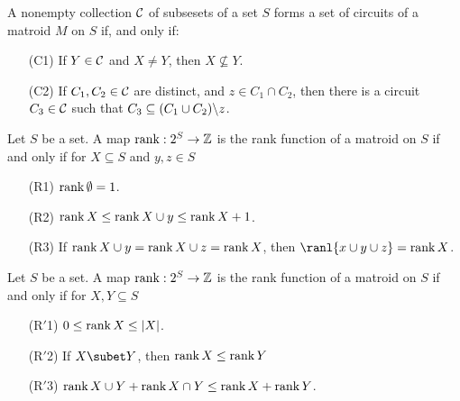\begin{theorem}\label{1.1.2}
    A nonempty collection $\mathcal{C}$ of subsesets of a set $S$ forms a set of circuits of a matroid $M$ on
    $S$ if, and only if:
        \begin{enumerate}
            \item[(C1)] If $Y \in \mathcal{C}$ and  $X \neq Y$, then  $X \not\subseteq Y$.

            \item[(C2)] If $ C_1,C_2 \in \mathcal{C}$ are distinct, and $z \in C_1 \cap C_2$, then there is
                a circuit $ C_3 \in \mathcal{C}$ such that $ C_3 \subseteq (C_1\cup C_2)\backslash z$.
        \end{enumerate}
\end{theorem}

\begin{theorem}\label{1.1.3}
    Let $S$ be a set. A map $\operatorname{rank}:2^S \rightarrow \mathbb{Z}$ is the rank function of a matroid on $S$ if
    and only if for $X \subseteq S$ and  $y,z \in S$
        \begin{enumerate}
            \item[(R1)] $\operatorname{rank}{\emptyset}=1$.

            \item[(R2)] $\operatorname{rank}{X} \leq \operatorname{rank}{X \cup y} \leq \operatorname{rank}{X}+1$.

            \item[(R3)] If $\operatorname{rank}{X \cup y}=\operatorname{rank}{X \cup z}=\operatorname{rank}{X}$, then $\ranl{x \cup y \cup
                z}=\rank{X}$.
        \end{enumerate}
\end{theorem}

\begin{theorem}\label{1.1.4}
    Let $S$ be a set. A map $\operatorname{rank}:2^S \rightarrow \mathbb{Z}$ is the rank function of a matroid on $S$ if
    and only if for $X,Y \subseteq S$
        \begin{enumerate}
            \item[(R$'$1)] $0 \leq \operatorname{rank}{X} \leq |X|$.

            \item[(R$'$2)] If $X \subet Y$, then  $\operatorname{rank}{X} \leq \operatorname{rank}{Y}$ 

            \item[(R$'$3)] $\operatorname{rank}{X \cup Y}+\operatorname{rank}{X \cap Y} \leq \operatorname{rank}{X}+\operatorname{rank}{Y}$.
        \end{enumerate}
\end{theorem}

